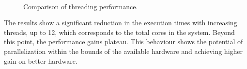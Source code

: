 \begin{figure}[H]
    \centering
    \\[1ex]
    \caption{Comparison of threading performance.}
    \label{fig:threading}
\end{figure}

The results show a significant reduction in the execution times with increasing threads, up to 12, which corresponds to the total cores in the system. Beyond this point, the performance gains plateau. This behaviour shows the potential of parallelization within the bounds of the available hardware and achieving higher gain on better hardware.  

